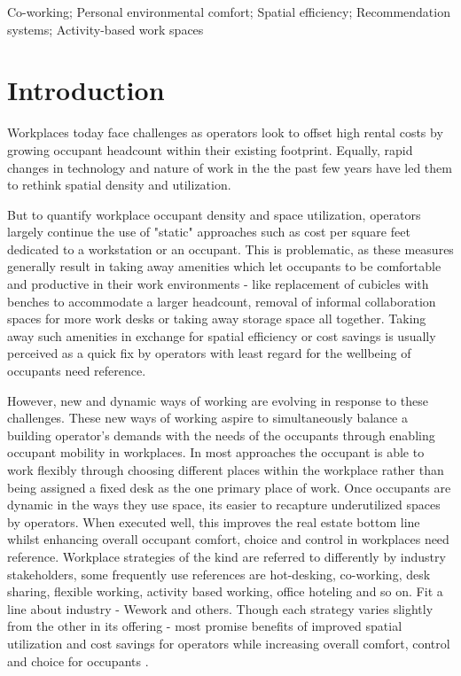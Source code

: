 \documentclass[]{interact}
\theoremstyle{plain}%
\theoremstyle{definition}
\theoremstyle{remark}
\begin{document}
\begin{keywords}
Co-working; Personal environmental comfort; Spatial efficiency; Recommendation systems; Activity-based work spaces
\end{keywords}




\section{Introduction}
Workplaces today face challenges as operators look to offset high rental costs by growing occupant headcount within their existing footprint. Equally, rapid changes in technology and nature of work in the the past few years have led them to rethink spatial density and utilization. 

But to quantify workplace occupant density and space utilization, operators largely continue the use of "static" approaches such as cost per square feet dedicated to a workstation or an occupant. This is problematic, as these measures generally result in taking away amenities which let occupants to be comfortable and productive in their work environments - like replacement of cubicles with benches to accommodate a larger headcount, removal of informal collaboration spaces for more work desks or taking away storage space all together. Taking away such amenities in exchange for spatial efficiency or cost savings is usually perceived as a quick fix by operators with least regard for the wellbeing of occupants {need reference}.

However, new and dynamic ways of working are evolving in response to these challenges. These new ways of working aspire to simultaneously balance a building operator's demands with the needs of the occupants through enabling occupant mobility in workplaces. In most approaches the occupant is able to work flexibly through choosing different places within the workplace rather than being assigned a fixed desk as the one primary place of work. Once occupants are dynamic in the ways they use space, its easier to recapture underutilized spaces by operators. When executed well, this improves the real estate bottom line whilst enhancing overall occupant comfort, choice and control in workplaces {need reference}. Workplace strategies of the kind are referred to differently by industry stakeholders, some frequently use references are hot-desking, co-working, desk sharing, flexible working, activity based working, office hoteling and so on. Fit a line about industry - Wework and others. Though each strategy varies slightly from the other in its offering - most promise benefits of improved spatial utilization and cost savings for operators while increasing overall comfort, control and choice for occupants \citep{Engelen2018IsReview}. %
\end{document}
